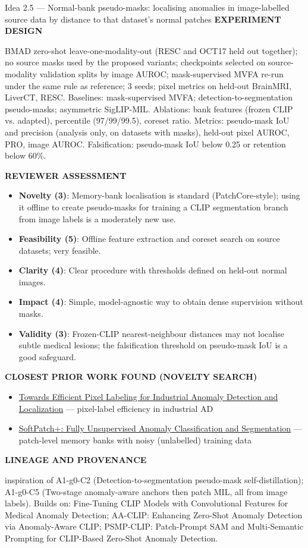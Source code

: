 \documentclass[11pt,a4paper]{article}
\newcommand{\lbl}[1]{{\sffamily\footnotesize\bfseries\color{muted}\MakeUppercase{#1}}\par}
\begin{document}
\begin{ideabox}{Idea 2.5 — Normal-bank pseudo-masks: localising anomalies in image-labelled source data by distance to that dataset's normal patches}
\lbl{Experiment design}BMAD zero-shot leave-one-modality-out (RESC and OCT17 held out together); no source masks used by the proposed variants; checkpoints selected on source-modality validation splits by image AUROC; mask-supervised MVFA re-run under the same rule as reference; 3 seeds; pixel metrics on held-out BrainMRI, LiverCT, RESC. Baselines: mask-supervised MVFA; detection-to-segmentation pseudo-masks; asymmetric SigLIP-MIL. Ablations: bank features (frozen CLIP vs. adapted), percentile (97/99/99.5), coreset ratio. Metrics: pseudo-mask IoU and precision (analysis only, on datasets with masks), held-out pixel AUROC, PRO, image AUROC. Falsification: pseudo-mask IoU below 0.25 or retention below 60\%.

\lbl{Reviewer assessment}\begin{itemize}[leftmargin=1.2em,itemsep=1pt,topsep=2pt]
\item \textbf{Novelty (3)}: Memory-bank localisation is standard (PatchCore-style); using it offline to create pseudo-masks for training a CLIP segmentation branch from image labels is a moderately new use.
\item \textbf{Feasibility (5)}: Offline feature extraction and coreset search on source datasets; very feasible.
\item \textbf{Clarity (4)}: Clear procedure with thresholds defined on held-out normal images.
\item \textbf{Impact (4)}: Simple, model-agnostic way to obtain dense supervision without masks.
\item \textbf{Validity (3)}: Frozen-CLIP nearest-neighbour distances may not localise subtle medical lesions; the falsification threshold on pseudo-mask IoU is a good safeguard.
\end{itemize}
\lbl{Closest prior work found (novelty search)}\begin{itemize}[leftmargin=1.2em,itemsep=1pt,topsep=2pt]
\item \href{https://arxiv.org/pdf/2407.03130}{Towards Efficient Pixel Labeling for Industrial Anomaly Detection and Localization} — pixel-label efficiency in industrial AD
\item \href{https://arxiv.org/pdf/2412.20870}{SoftPatch+: Fully Unsupervised Anomaly Classification and Segmentation} — patch-level memory banks with noisy (unlabelled) training data
\end{itemize}
\lbl{Lineage and provenance}{\small inspiration of A1-g0-C2 (Detection-to-segmentation pseudo-mask self-distillation); A1-g0-C5 (Two-stage anomaly-aware anchors then patch MIL, all from image labels). Builds on: Fine-Tuning CLIP Models with Convolutional Features for Medical Anomaly Detection; AA-CLIP: Enhancing Zero-Shot Anomaly Detection via Anomaly-Aware CLIP; PSMP-CLIP: Patch-Prompt SAM and Multi-Semantic Prompting for CLIP-Based Zero-Shot Anomaly Detection.}
\end{ideabox}
\end{document}
